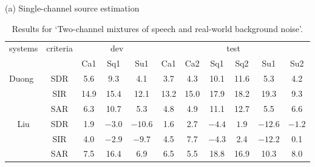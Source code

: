 \documentclass{article}
\begin{document}
\begin{table*}\footnotesize
\centering
\caption{\footnotesize Results for `Two-channel mixtures of speech and real-world background noise'. 
}
\label{tab:BGN}
(a) Single-channel source estimation
\begin{tabular}{|c|c|ccc|cccccc|}
\hline
\multirow{2}{*}{systems}& \multirow{2}{*}{criteria} & \multicolumn{3}{c|}{dev} & \multicolumn{6}{c|}{test}\\
&&Ca1&Sq1&Su1&Ca1&Ca2&Sq1&Sq2&Su1&Su2\\\hline
\multirow{3}{*}{Duong~\cite{Duong2015}}&SDR&5.6&9.3&4.1&3.7&4.3&10.1&11.6&5.3&4.2\\
&SIR&14.9&15.4&12.1&13.2&15.0&17.9&18.2&19.3&9.3\\
&SAR&6.3&10.7&5.3&4.8&4.9&11.1&12.7&5.5&6.6\\\hline
\multirow{3}{*}{Liu}&SDR&1.9&$-3.0$&$-10.6$&1.6&2.7&$-4.4$&$1.9$&$-12.6$&$-1.2$\\
&SIR&4.0&$-2.9$&$-9.7$&4.5&7.7&$-4.3$&2.4&$-12.2$&0.1\\
&SAR&7.5&16.4&6.9&6.5&5.5&18.8&16.9&10.3&8.0\\\hline
\end{tabular}


\end{table*}
\end{document}
